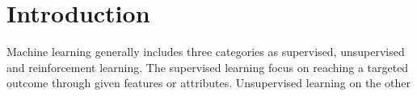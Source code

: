\section{Introduction}

Machine learning generally includes three categories as supervised, unsupervised and reinforcement learning. The supervised learning focus on reaching a targeted outcome through given features or attributes. Unsupervised learning on the other
